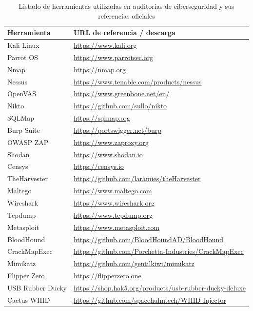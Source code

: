 \documentclass[a4paper, 10pt]{article}
\begin{document}
\begin{table}[H]
\centering
\begin{tabular}{|p{4cm}|p{8cm}|}
\hline
\textbf{Herramienta} & \textbf{URL de referencia / descarga} \\
\hline
Kali Linux & \url{https://www.kali.org} \\
Parrot OS & \url{https://www.parrotsec.org} \\
Nmap & \url{https://nmap.org} \\
Nessus & \url{https://www.tenable.com/products/nessus} \\
OpenVAS & \url{https://www.greenbone.net/en/} \\
Nikto & \url{https://github.com/sullo/nikto} \\
SQLMap & \url{https://sqlmap.org} \\
Burp Suite & \url{https://portswigger.net/burp} \\
OWASP ZAP & \url{https://www.zaproxy.org} \\
Shodan & \url{https://www.shodan.io} \\
Censys & \url{https://censys.io} \\
TheHarvester & \url{https://github.com/laramies/theHarvester} \\
Maltego & \url{https://www.maltego.com} \\
Wireshark & \url{https://www.wireshark.org} \\
Tcpdump & \url{https://www.tcpdump.org} \\
Metasploit & \url{https://www.metasploit.com} \\
BloodHound & \url{https://github.com/BloodHoundAD/BloodHound} \\
CrackMapExec & \url{https://github.com/Porchetta-Industries/CrackMapExec} \\
Mimikatz & \url{https://github.com/gentilkiwi/mimikatz} \\
Flipper Zero & \url{https://flipperzero.one} \\
USB Rubber Ducky & \url{https://shop.hak5.org/products/usb-rubber-ducky-deluxe} \\
Cactus WHID & \url{https://github.com/spacehuhntech/WHID-Injector} \\
\hline
\end{tabular}
\caption{Listado de herramientas utilizadas en auditorías de ciberseguridad y sus referencias oficiales}
\end{table}


\clearpage
\end{document}
